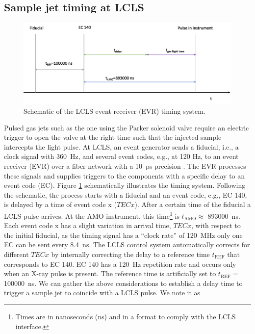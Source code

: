 \subsection{Sample jet timing at LCLS}\label{sec:jet-timing}
\begin{figure}
	\centering
		\includegraphics[width=1.00\textwidth]{images/LCLS-timing-schematic.png}
	\caption{Schematic of the LCLS event receiver (EVR) timing system.}
	\label{fig:LCLS-EVR-timing}
\end{figure}
Pulsed gas jets such as the one using the Parker solenoid valve require an electric trigger to open the valve at the right time such that the injected sample intercepts the light pulse. At LCLS, an event generator sends a fiducial, i.e., a clock signal with \SI{360}{\hertz}, and several event codes, e.g., at 120 Hz, to an event receiver (EVR) over a fiber network with a \SI{10}{\pico\second} precision \citep{Krejcik-2007-DIPAC}. The EVR processes these signals and supplies triggers to the components with a specific delay to an event code (EC). Figure \ref{fig:LCLS-EVR-timing} schematically illustrates the timing system. Following the schematic, the process starts with a fiducial and an event code, e.g., EC 140, is delayed by a time of event code x ($TECx$). After a certain time of the fiducial a LCLS pulse arrives. At the AMO instrument, this time\footnote{Times are in nanoseconds (ns) and in a format to comply with the LCLS interface.} is $t_{\text{AMO}}\approx$ \SI{893000}{\nano\second}. Each event code x has a slight variation in arrival time, $TECx$, with respect to the initial fiducial, as the timing signal has a ``clock rate'' of \SI{120}{\mega\hertz} only one EC can be sent every \SI{8.4}{\nano\second}. The LCLS control system automatically corrects for different $TECx$ by internally correcting the delay to a reference time $t_{\text{REF}}$ that corresponds to EC 140. EC 140 has a \SI{120}{\hertz} repetition rate and occurs only when an X-ray pulse is present. The reference time is artificially set to $t_{\text{REF}}=$ \SI{100000}{\nano\second}. We can gather the above considerations to establish a delay time to trigger a sample jet to coincide with a LCLS pulse. We note it as
